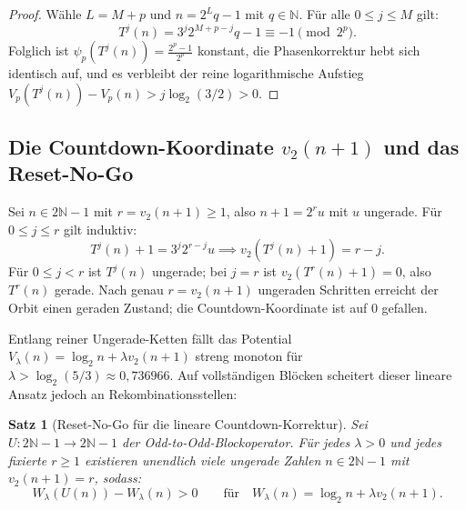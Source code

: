 \documentclass[11pt,reqno]{amsart}
\newtheorem{theorem}{Satz}[section]
\theoremstyle{definition}
\theoremstyle{remark}
\numberwithin{equation}{section}
\begin{document}
\begin{proof}
Wähle $L = M + p$ und $n = 2^L q - 1$ mit $q \in \mathbb{N}$. Für alle $0 \le j \le M$ gilt:
\begin{equation}
T^j(n) = 3^j 2^{M+p-j} q - 1 \equiv -1 \pmod{2^p}.
\end{equation}
Folglich ist $\psi_p(T^j(n)) = \frac{2^p - 1}{2^p}$ konstant, die Phasenkorrektur hebt sich identisch auf, und es verbleibt der reine logarithmische Aufstieg $V_p(T^j(n)) - V_p(n) > j \log_2(3/2) > 0$.
\end{proof}

\subsection{Die Countdown-Koordinate $v_2(n+1)$ und das Reset-No-Go}

Sei $n \in 2\mathbb{N}-1$ mit $r = v_2(n+1) \ge 1$, also $n + 1 = 2^r u$ mit $u$ ungerade. Für $0 \le j \le r$ gilt induktiv:
\begin{equation}
T^j(n) + 1 = 3^j 2^{r-j} u \implies v_2(T^j(n) + 1) = r - j.
\end{equation}
Für $0 \le j < r$ ist $T^j(n)$ ungerade; bei $j = r$ ist $v_2(T^r(n)+1) = 0$, also $T^r(n)$ gerade.
Nach genau $r = v_2(n+1)$ ungeraden Schritten erreicht der Orbit einen geraden Zustand; die Countdown-Koordinate ist auf 0 gefallen.

Entlang reiner Ungerade-Ketten fällt das Potential $V_\lambda(n) = \log_2 n + \lambda v_2(n+1)$ streng monoton für $\lambda > \log_2(5/3) \approx 0{,}736966$. 
Auf vollständigen Blöcken scheitert dieser lineare Ansatz jedoch an Rekombinationsstellen:

\begin{theorem}[Reset-No-Go für die lineare Countdown-Korrektur]
\label{thm:reset_nogo}
Sei $U: 2\mathbb{N}-1 \to 2\mathbb{N}-1$ der Odd-to-Odd-Blockoperator.
Für jedes $\lambda > 0$ und jedes fixierte $r \ge 1$ existieren unendlich viele ungerade Zahlen $n \in 2\mathbb{N}-1$ mit $v_2(n+1) = r$, sodass:
\begin{equation}
W_\lambda(U(n)) - W_\lambda(n) > 0 \qquad \text{für} \quad W_\lambda(n) = \log_2 n + \lambda v_2(n+1).
\end{equation}
\end{theorem}
\end{document}

